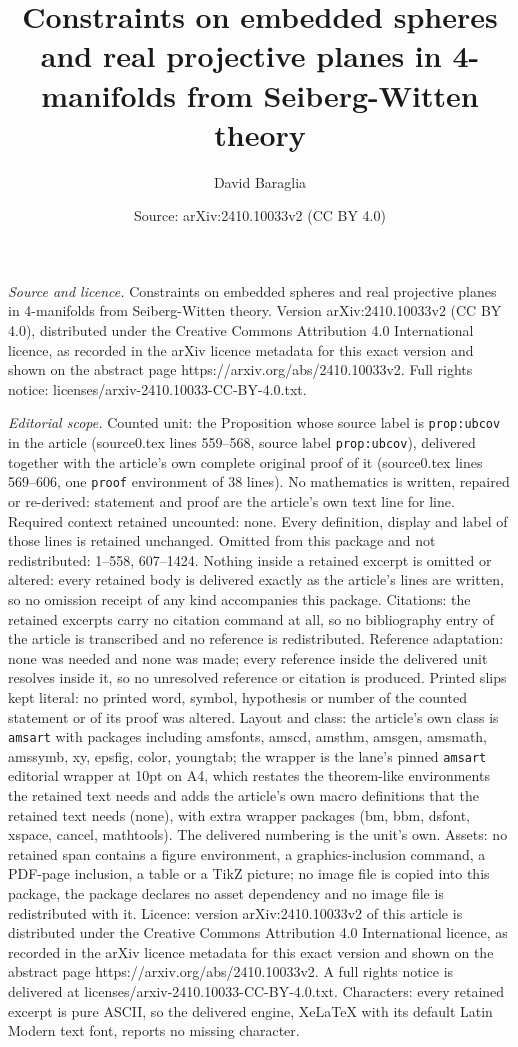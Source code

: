 \documentclass[10pt,a4paper]{amsart}
\title[Constraints on embedded spheres and real projective planes i]{Constraints on embedded spheres and real projective planes in 4-manifolds from Seiberg-Witten theory}
\author{David Baraglia}
\date{Source: arXiv:2410.10033v2 (CC BY 4.0)}
\begin{document}
\maketitle

\noindent\emph{Source and licence.} Constraints on embedded spheres and real projective planes in 4-manifolds from Seiberg-Witten theory. Version arXiv:2410.10033v2 (CC BY 4.0), distributed under the Creative Commons Attribution 4.0 International licence, as recorded in the arXiv licence metadata for this exact version and shown on the abstract page https://arxiv.org/abs/2410.10033v2. Full rights notice: licenses/arxiv-2410.10033-CC-BY-4.0.txt.\par\smallskip

\noindent\textit{Editorial scope.} Counted unit: the Proposition whose source label is \texttt{prop:ubcov} in the article (source0.tex lines 559--568, source label \texttt{prop:ubcov}), delivered together with the article's own complete original proof of it (source0.tex lines 569--606, one \texttt{proof} environment of 38 lines). No mathematics is written, repaired or re-derived: statement and proof are the article's own text line for line. Required context retained uncounted: none. Every definition, display and label of those lines is retained unchanged. Omitted from this package and not redistributed: 1--558, 607--1424. Nothing inside a retained excerpt is omitted or altered: every retained body is delivered exactly as the article's lines are written, so no omission receipt of any kind accompanies this package. Citations: the retained excerpts carry no citation command at all, so no bibliography entry of the article is transcribed and no reference is redistributed. Reference adaptation: none was needed and none was made; every reference inside the delivered unit resolves inside it, so no unresolved reference or citation is produced. Printed slips kept literal: no printed word, symbol, hypothesis or number of the counted statement or of its proof was altered. Layout and class: the article's own class is \texttt{amsart} with packages including amsfonts, amscd, amsthm, amsgen, amsmath, amssymb, xy, epsfig, color, youngtab; the wrapper is the lane's pinned \texttt{amsart} editorial wrapper at 10pt on A4, which restates the theorem-like environments the retained text needs and adds the article's own macro definitions that the retained text needs (none), with extra wrapper packages (bm, bbm, dsfont, xspace, cancel, mathtools). The delivered numbering is the unit's own. Assets: no retained span contains a figure environment, a graphics-inclusion command, a PDF-page inclusion, a table or a TikZ picture; no image file is copied into this package, the package declares no asset dependency and no image file is redistributed with it. Licence: version arXiv:2410.10033v2 of this article is distributed under the Creative Commons Attribution 4.0 International licence, as recorded in the arXiv licence metadata for this exact version and shown on the abstract page https://arxiv.org/abs/2410.10033v2. A full rights notice is delivered at licenses/arxiv-2410.10033-CC-BY-4.0.txt. Characters: every retained excerpt is pure ASCII, so the delivered engine, XeLaTeX with its default Latin Modern text font, reports no missing character.
\end{document}
